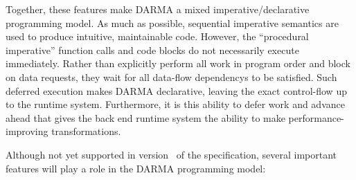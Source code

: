 Together, these features make \gls{DARMA} a mixed \gls{imperative}/\gls{declarative} \gls{programming model}.
As much as possible, sequential \gls{imperative} semantics are used to produce intuitive, maintainable code.
However, the ``\gls{procedural} \gls{imperative}'' function calls and code
blocks do not necessarily execute immediately.
Rather than explicitly perform all work in program order and block on data requests,
they wait for all \glspl{data-flow dependency} to be satisfied.
Such \gls{deferred execution} makes \gls{DARMA} \gls{declarative}, leaving the
exact control-flow up to the \gls{runtime system}.
Furthermore, it is this ability to defer work and advance ahead that gives the \gls{back end}
\gls{runtime  system} the ability to make performance-improving transformations.








Although not yet supported in version \specVersion\ of the specification, several
important features will play a role in the \gls{DARMA} \gls{programming model}:

